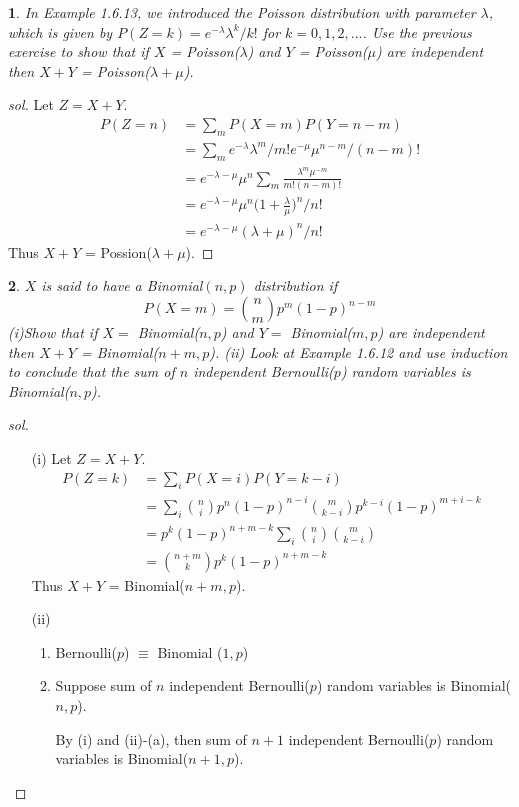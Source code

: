 \documentclass{report}
\newtheorem{ex}{}[section]
\begin{document}
\begin{ex}
In Example 1.6.13, we introduced the Poisson distribution with parameter $\lambda$, which is given by $P(Z = k) = e^{-\lambda}\lambda^k / k!$ for $k = 0,1,2,...$. Use the previous exercise to show that if $X$ = Poisson($\lambda$) and $Y$ = Poisson($\mu$) are independent then $X + Y$ = Poisson($\lambda + \mu$).
\end{ex}
\begin{proof}[sol]
Let $Z = X+Y$.
\begin{align*}
    P(Z = n) &= \sum_m P(X = m)P(Y = n-m)\\
    &=\sum_m e^{-\lambda}\lambda^m / m! e^{-\mu}\mu^{n-m}/(n-m)!\\
    &=e^{-\lambda-\mu}\mu^n \sum_m \frac{\lambda^m \mu^{-m}}{m!(n-m)!}\\
    &=e^{-\lambda-\mu}\mu^n\bigg(1 + \frac{\lambda}{\mu}\bigg)^n/n!\\
    &=e^{-\lambda-\mu}(\lambda + \mu)^n/n!
\end{align*}
Thus $X + Y$ = Possion($\lambda + \mu$).
\end{proof}
\begin{ex}
$X$ is said to have a Binomial$(n,p)$ distribution if
\[P(X = m) = \binom{n}{m}p^m(1-p)^{n-m}\]
(i)Show that if $X = $ Binomial($n,p$) and $Y = $ Binomial($m,p$) are independent then $X+Y$ = Binomial($n+m,p$). (ii) Look at Example 1.6.12 and use induction to conclude that the sum of $n$ independent Bernoulli($p$) random variables is Binomial($n,p$).
\end{ex}
\begin{proof}[sol]~
\begin{enumerate}
    \item[(i)] 
    Let $Z = X+Y$.
\begin{align*}
    P(Z = k) &= \sum_i P(X = i)P(Y = k-i)\\
    &=\sum_i \binom{n}{i}p^n(1-p)^{n-i}\binom{m}{k-i}p^{k-i}(1-p)^{m+i-k}\\
    &=p^k(1-p)^{n+m-k}\sum_i\binom{n}{i}\binom{m}{k-i}\\
    &=\binom{n+m}{k}p^k(1-p)^{n+m-k}
\end{align*}
Thus $X + Y$ = Binomial($n+m, p$).
    \item[(ii)]
    \begin{enumerate}
        \item Bernoulli($p$) $\equiv$ Binomial ($1, p$)
        \item Suppose sum of $n$ independent Bernoulli($p$) random variables is Binomial($n,p$).
        
        By (i) and (ii)-(a), then sum of $n+1$ independent Bernoulli($p$) random variables is Binomial($n+1, p$).
    \end{enumerate}
\end{enumerate}
\end{proof}
\end{document}

